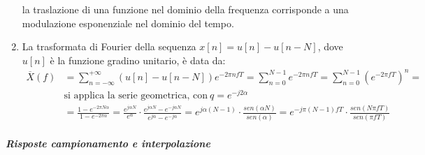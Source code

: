 \documentclass[
]{article}
\begin{document}
\begin{enumerate}
  la traslazione di una funzione nel dominio della frequenza corrisponde
  a una modulazione esponenziale nel dominio del tempo.
\item
  La trasformata di Fourier della sequenza \(x[n]=u[n]-u[n-N]\), dove
  \(u[n]\) è la funzione gradino unitario, è data da: \begin{align*}
  \displaystyle \overline{X}(f) &= \sum_{n = -\infty}^{+\infty} (u[n]-u[n-N])e^{-2\pi nfT} = \sum_{n = 0}^{N-1}e^{-2\pi nfT} = \sum_{n = 0}^{N-1}(e^{-2\pi fT})^n = \\
  &\text{si applica la serie geometrica, con} \ q = e^{-j2\alpha}& \\
  &= \frac{1-e^{-2\pi N\alpha}}{1-e^{-2\pi \alpha}} = \frac{e^{j \alpha N}}{e^{\alpha}} \cdot \frac{e^{j\alpha N} - e^{-j\alpha N}}{e^{j\alpha } - e^{-j\alpha }} = e^{j \alpha (N-1)} \cdot \frac{sen(\alpha N)}{sen(\alpha)} = e^{-j\pi (N-1)fT} \cdot \frac{sen(N\pi fT)}{sen(\pi fT)}
  \end{align*}
\end{enumerate}

\subparagraph{Risposte campionamento e
interpolazione}\label{risposte-campionamento-e-interpolazione}
\end{document}
